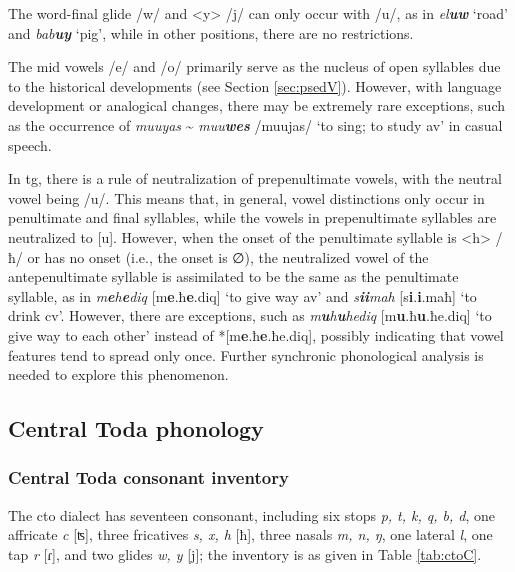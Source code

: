 The word-final glide /w/ and <y> /j/ can only occur with /u/, as in \textit{el\textbf{uw}} `road' and \textit{bab\textbf{uy}} `pig', while in other positions, there are no restrictions.

The mid vowels /e/ and /o/ primarily serve as the nucleus of open syllables due to the historical developments (see Section \ref{sec:psedV}). However, with language development or analogical changes, there may be extremely rare exceptions, such as the occurrence of \textit{muuyas} \~{} \textit{muu\textbf{wes}} /muujas/ `to sing; to study \acs{av}' in casual speech.

In \acl{tg}, there is a rule of neutralization of prepenultimate vowels, with the neutral vowel being /u/. This means that, in general, vowel distinctions only occur in penultimate and final syllables, while the vowels in prepenultimate syllables are neutralized to [u]. However, when the onset of the penultimate syllable is <h> /ħ/ or has no onset (i.e., the onset is ∅), the neutralized vowel of the antepenultimate syllable is assimilated to be the same as the penultimate syllable, as in \textit{m\textbf{e}h\textbf{e}diq} [m\textbf{e}.ħ\textbf{e}.diq] `to give way \acs{av}' and \textit{s\textbf{ii}mah} [s\textbf{i}.\textbf{i}.maħ] `to drink \acs{cv}'. However, there are exceptions, such as \textit{m\textbf{u}h\textbf{u}hediq} [m\textbf{u}.ħ\textbf{u}.ħe.diq] `to give way to each other' instead of *[m\textbf{e}.ħ\textbf{e}.ħe.diq], possibly indicating that vowel features tend to spread only once. Further synchronic phonological analysis is needed to explore this phenomenon.


\subsection{Central Toda phonology}

\subsubsection{Central Toda consonant inventory}

The \acl{cto} dialect has seventeen consonant, including six stops \textit{p, t, k, q, b, d}, one affricate \textit{c} [ʦ], three fricatives \textit{s, x, h} [ħ], three nasals \textit{m, n, ŋ}, one lateral \textit{l}, one tap \textit{r} [ɾ], and two glides \textit{w, y} [j]; the inventory is as given in Table \ref{tab:ctoC}.

